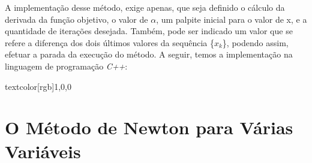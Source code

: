 \hspace{0.8cm}
A implementação desse método, exige apenas, que seja definido o cálculo
da derivada da função objetivo, o valor de $\alpha$, um palpite inicial para
o valor de x, e a quantidade de iterações desejada. Também, pode ser
indicado um valor que se refere a diferença dos dois últimos valores
da sequência \{$x_k$\}, podendo assim, efetuar a parada da execução do
método. A seguir, temos a implementação na linguagem de programação
\textit{C++}:

\vspace{0.2cm}





textcolor[rgb]{1,0,0}{\section{{O Método de Newton para Várias Variáveis}}}
